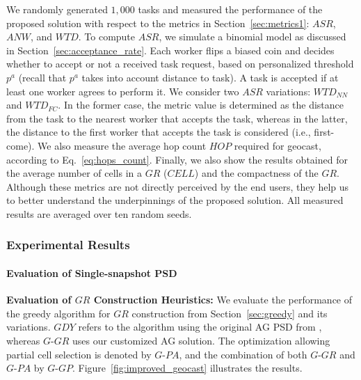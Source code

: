 \documentclass{USC-Thesis}
\numberwithin{equation}{chapter}
\begin{document}
We randomly generated $1,000$ tasks and measured the performance of the proposed solution with respect to the metrics in Section~\ref{sec:metrics1}: $\mathit{ASR}$, $\mathit{ANW}$, and $\mathit{WTD}$. 
To compute $\mathit{ASR}$, we simulate a binomial model as discussed in Section~\ref{sec:acceptance_rate}. Each worker flips a biased coin and decides whether to accept or not a received task request, based on personalized threshold $p^a$ (recall that $p^a$ takes into account distance to task).
A task is accepted if at least one worker agrees to perform it.
We consider two $\mathit{ASR}$ variations: $\mathit{WTD_{NN}}$ and $\mathit{WTD_{FC}}$. In the former case, the metric value is determined as the distance from the task to the nearest worker that accepts the task, whereas in the latter, the distance to the first worker that accepts the task is considered (i.e., first-come).
We also measure the average hop count $\mathit{HOP}$ required for geocast, according to Eq.~\eqref{eq:hops_count}.
Finally, we also show the results obtained for the average number of cells in a $\mathit{GR}$ ($\mathit{CELL}$) and the compactness of the $\mathit{GR}$. Although these metrics are not directly perceived by the end users, they help us to better understand the underpinnings of the proposed solution.
All measured results are averaged over ten random seeds.


\subsubsection{Experimental Results}

\paragraph{Evaluation of Single-snapshot PSD}

\textbf{Evaluation of $\mathit{GR}$ Construction Heuristics:}
We evaluate the performance of the greedy algorithm for $\mathit{GR}$ construction from Section~\ref{sec:greedy} and its variations. $\mathit{GDY}$ refers to the algorithm using the original AG PSD from \cite{qardaji2012differentially}, whereas $G$-$\mathit{GR}$ uses our customized AG solution. The optimization allowing partial cell selection is denoted by $G$-$\mathit{PA}$, and the combination of both $G$-$\mathit{GR}$ and $G$-$\mathit{PA}$ by $G$-$\mathit{GP}$. Figure~\ref{fig:improved_geocast} illustrates the results.
\end{document}
